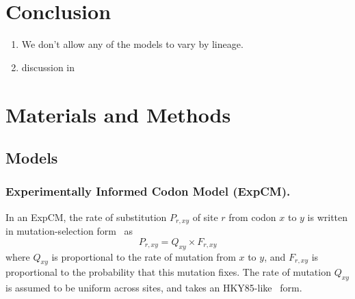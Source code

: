 \documentclass[11pt]{article}
\begin{document}
\section*{Conclusion}

\begin{enumerate}
  \item We don't allow any of the models to vary by lineage. 
  \item discussion in \citet{rodrigue2010mutation}
\end{enumerate}

\section*{Materials and Methods}

\subsection*{Models}

\subsubsection*{Experimentally Informed Codon Model (ExpCM).}

In an ExpCM, the rate of substitution $P_{r,xy}$ of site $r$ from codon $x$ to $y$ is written in mutation-selection form~\citep{halpern1998evolutionary,mccandlish2014modeling,spielman2015relationship} as
\begin{equation}
\label{eq:ExpCM}
P_{r,xy} = Q_{xy} \times F_{r,xy}
\end{equation}
where $Q_{xy}$ is proportional to the rate of mutation from $x$ to $y$, and $F_{r,xy}$ is proportional to the probability that this mutation fixes.
The rate of mutation $Q_{xy}$ is assumed to be uniform across sites, and takes an HKY85-like~\citep{hasegawa1985dating} form.
\end{document}
